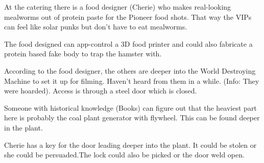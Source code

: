 At the catering there is a food designer (Cherie) who makes real-looking mealworms out of protein paste for the Pioneer food shots.  That way the VIPs can feel like solar punks but don't have to eat mealworms.

The food designed can app-control a 3D food printer and could also fabricate a protein based fake body to trap the hamster with.

According to the food designer, the others are deeper into the World Destroying Machine to set it up for filming. Haven't heard from them in a while. (Info: They were hoarded). Access is through a steel door which is closed.

Someone with historical knowledge (Books) can figure out that the heaviest part here is probably the coal plant generator with flywheel. This can be found deeper in the plant.

Cherie has a key for the door leading deeper into the plant. It could be stolen or she could be persuaded.The lock could also be picked or the door weld open.


